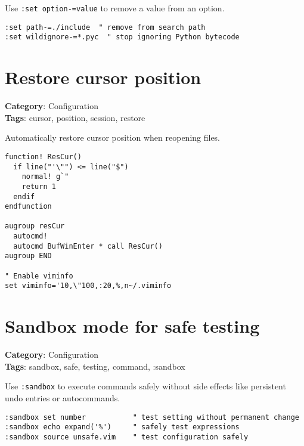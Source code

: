 {{{{Use {\footnotesize \Verb§:set option-=value§} to remove a value from an option.

\begin{Exa*}{}
\begin{Verbatim}[fontsize=\footnotesize, breaklines, breakanywhere]
:set path-=./include  " remove from search path
:set wildignore-=*.pyc  " stop ignoring Python bytecode
\end{Verbatim}
\end{Exa*}

\section{Restore cursor position}

\textbf{Category}: Configuration\\ \textbf{Tags}: cursor, position, session, restore
\vspace{0.5cm}

Automatically restore cursor position when reopening files.

\begin{Exa*}{}
\begin{Verbatim}[fontsize=\footnotesize, breaklines, breakanywhere]
function! ResCur()
  if line("'\"") <= line("$")
    normal! g`"
    return 1
  endif
endfunction

augroup resCur
  autocmd!
  autocmd BufWinEnter * call ResCur()
augroup END

" Enable viminfo
set viminfo='10,\"100,:20,%,n~/.viminfo
\end{Verbatim}
\end{Exa*}

\section{Sandbox mode for safe testing}

\textbf{Category}: Configuration\\ \textbf{Tags}: sandbox, safe, testing, command, :sandbox
\vspace{0.5cm}

Use {\footnotesize \Verb§:sandbox§} to execute commands safely without side effects like persistent undo entries or autocommands.

\begin{Exa*}{}
\begin{Verbatim}[fontsize=\footnotesize, breaklines, breakanywhere]
:sandbox set number           " test setting without permanent change
:sandbox echo expand('%')     " safely test expressions
:sandbox source unsafe.vim    " test configuration safely
\end{Verbatim}
\end{Exa*}

}}}}

